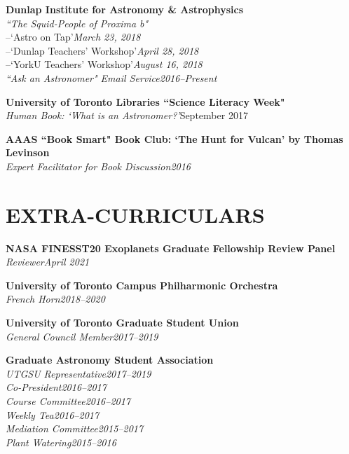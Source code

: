 \documentclass[10pt]{res} %
\begin{document}
\begin{resume}
\textbf{Dunlap Institute for Astronomy \& Astrophysics}\\
{\sl ``The Squid-People of Proxima b"}\\
 {--\hspace{10mm}`Astro on Tap'}\hfill{\sl March 23, 2018}\\
 {--\hspace{10mm}`Dunlap Teachers' Workshop'}\hfill{\sl April 28, 2018}\\
 {--\hspace{10mm}`YorkU Teachers' Workshop'}\hfill{\sl August 16, 2018}\\
{\sl ``Ask an Astronomer" Email Service}\hfill{\sl 2016--Present}%

\textbf{University of Toronto Libraries ``Science Literacy Week"}\\
{\sl Human Book: `What is an Astronomer?'}\hfill{September 2017}

\textbf{AAAS ``Book Smart" Book Club: `The Hunt for Vulcan' by Thomas Levinson}\\
{\sl Expert Facilitator for Book Discussion}\hfill{\sl 2016}

\section{EXTRA-CURRICULARS} 
% 
\textbf{NASA FINESST20 Exoplanets Graduate Fellowship Review Panel}\\
{\sl Reviewer}\hfill{\sl April 2021}

 \textbf{University of Toronto Campus Philharmonic Orchestra}\\
{\sl French Horn}\hfill{\sl 2018--2020}

\textbf{University of Toronto Graduate Student Union}\\
{\sl General Council Member}\hfill{\sl 2017--2019}

\textbf{Graduate Astronomy Student Association}\\
{\sl UTGSU Representative}\hfill{\sl 2017--2019}\\
{\sl Co-President}\hfill{\sl 2016--2017}\\
{\sl Course Committee}\hfill{\sl 2016--2017}\\
{\sl Weekly Tea}\hfill{\sl 2016--2017}\\
{\sl Mediation Committee}\hfill{\sl 2015--2017}\\
{\sl Plant Watering}\hfill{\sl 2015--2016}


\end{resume}
\end{document}
